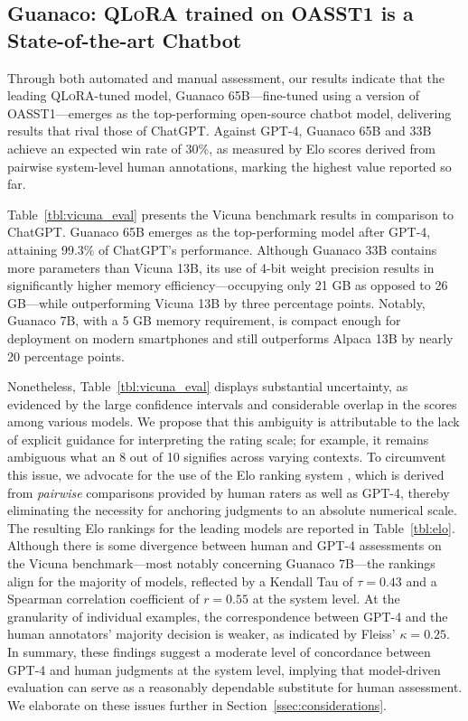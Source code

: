 \subsection{\textbf{Guanaco}: \textsc{QLoRA} trained on OASST1 is a State-of-the-art Chatbot} Through both automated and manual assessment, our results indicate that the leading \textsc{QLoRA}-tuned model, {Guanaco} 65B—fine-tuned using a version of OASST1—emerges as the top-performing open-source chatbot model, delivering results that rival those of ChatGPT. Against GPT-4, {Guanaco} 65B and 33B achieve an expected win rate of 30\%, as measured by Elo scores derived from pairwise system-level human annotations, marking the highest value reported so far.

Table~\ref{tbl:vicuna_eval} presents the Vicuna benchmark \cite{vicuna2023} results in comparison to ChatGPT. {Guanaco} 65B emerges as the top-performing model after GPT-4, attaining 99.3\% of ChatGPT's performance. Although {Guanaco} 33B contains more parameters than Vicuna 13B, its use of 4-bit weight precision results in significantly higher memory efficiency—occupying only 21 GB as opposed to 26 GB—while outperforming Vicuna 13B by three percentage points. Notably, {Guanaco} 7B, with a 5 GB memory requirement, is compact enough for deployment on modern smartphones and still outperforms Alpaca 13B by nearly 20 percentage points.

Nonetheless, Table~\ref{tbl:vicuna_eval} displays substantial uncertainty, as evidenced by the large confidence intervals and considerable overlap in the scores among various models. We propose that this ambiguity is attributable to the lack of explicit guidance for interpreting the rating scale; for example, it remains ambiguous what an 8 out of 10 signifies across varying contexts. To circumvent this issue, we advocate for the use of the Elo ranking system \citep{elo1967proposed}, which is derived from \textit{pairwise} comparisons provided by human raters as well as GPT-4, thereby eliminating the necessity for anchoring judgments to an absolute numerical scale. The resulting Elo rankings for the leading models are reported in Table~\ref{tbl:elo}. Although there is some divergence between human and GPT-4 assessments on the Vicuna benchmark—most notably concerning Guanaco 7B—the rankings align for the majority of models, reflected by a Kendall Tau of $\tau=0.43$ and a Spearman correlation coefficient of $r=0.55$ at the system level. At the granularity of individual examples, the correspondence between GPT-4 and the human annotators' majority decision is weaker, as indicated by Fleiss' $\kappa=0.25$. In summary, these findings suggest a moderate level of concordance between GPT-4 and human judgments at the system level, implying that model-driven evaluation can serve as a reasonably dependable substitute for human assessment. We elaborate on these issues further in Section~\ref{ssec:considerations}.

